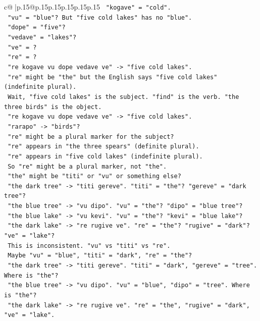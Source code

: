 \documentclass{article}
\begin{document}
{\begin{supertabular}{c@{$\;$}|p{.15\linewidth}@{}p{.15\linewidth}p{.15\linewidth}p{.15\linewidth}p{.15\linewidth}p{.15\linewidth}}
{{{\texttt{    "kogave" = "cold".} \\
\texttt{    "vu" = "blue"? But "five cold lakes" has no "blue".} \\
\texttt{    "dope" = "five"?} \\
\texttt{    "vedave" = "lakes"?} \\
\texttt{    "ve" = ?} \\
\texttt{    "re" = ?} \\
\texttt{    "re kogave vu dope vedave ve" {-}> "five cold lakes".} \\
\texttt{    "re" might be "the" but the English says "five cold lakes" (indefinite plural).} \\
\texttt{    Wait, "five cold lakes" is the subject. "find" is the verb. "the three birds" is the object.} \\
\texttt{    "re kogave vu dope vedave ve" {-}> "five cold lakes".} \\
\texttt{    "rarapo" {-}> "birds"?} \\
\texttt{    "re" might be a plural marker for the subject?} \\
\texttt{    "re" appears in "the three spears" (definite plural).} \\
\texttt{    "re" appears in "five cold lakes" (indefinite plural).} \\
\texttt{    So "re" might be a plural marker, not "the".} \\
\texttt{    "the" might be "titi" or "vu" or something else?} \\
\texttt{    "the dark tree" {-}> "titi gereve". "titi" = "the"? "gereve" = "dark tree"?} \\
\texttt{    "the blue tree" {-}> "vu dipo". "vu" = "the"? "dipo" = "blue tree"?} \\
\texttt{    "the blue lake" {-}> "vu kevi". "vu" = "the"? "kevi" = "blue lake"?} \\
\texttt{    "the dark lake" {-}> "re rugive ve". "re" = "the"? "rugive" = "dark"? "ve" = "lake"?} \\
\texttt{    This is inconsistent. "vu" vs "titi" vs "re".} \\
\texttt{    Maybe "vu" = "blue", "titi" = "dark", "re" = "the"?} \\
\texttt{    "the dark tree" {-}> "titi gereve". "titi" = "dark", "gereve" = "tree". Where is "the"?} \\
\texttt{    "the blue tree" {-}> "vu dipo". "vu" = "blue", "dipo" = "tree". Where is "the"?} \\
\texttt{    "the dark lake" {-}> "re rugive ve". "re" = "the", "rugive" = "dark", "ve" = "lake".} \\
}}}
\end{supertabular}}
\end{document}
